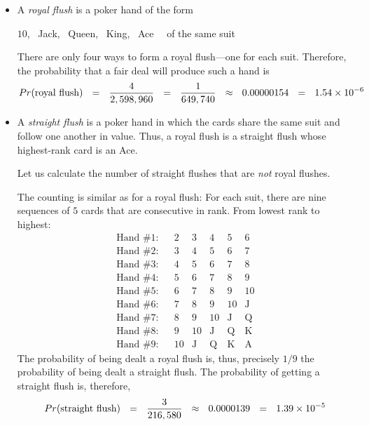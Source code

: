 \medskip

 
\begin{itemize}
\item
A {\it royal flush} is a poker hand of the form

\hspace*{.25in}$10$, \ {\sc Jack}, \ {\sc Queen}, \ {\sc King}, \ {\sc Ace} \ \ of the same suit

\noindent
There are only four ways to form a royal flush---one for each suit.  Therefore, the probability that
a fair deal will produce such a hand is
\[ 
Pr(\mbox{royal flush}) \ \ = \ \
\frac{4}{2,598,960} \ \ = \ \ {1 \over {649,740}} \ \ \approx \ \ 0.00000154 \ \ = \ \ 1.54 \times 10^{-6} \]

\item
A {\it straight flush} is a poker hand in which the cards share the same suit and follow one 
another in value.  Thus, a royal flush is a straight flush whose highest-rank card is an {\sc Ace}.

Let us calculate the number of straight flushes that are {\em not} royal flushes.

The counting is similar as for a royal flush:  For each suit, there are nine sequences of $5$ cards
that are consecutive in rank.  From lowest rank to highest:
\[ \begin{array}{llccccc}
\mbox{Hand \#1}: & &
2 & 3 & 4 & 5 & 6 \\
\mbox{Hand \#2}: & &
3 & 4 & 5 & 6 & 7 \\
\mbox{Hand \#3}: & &
4 & 5 & 6 & 7 & 8 \\
\mbox{Hand \#4}: & &
5 & 6 & 7 & 8 & 9 \\
\mbox{Hand \#5}: & &
6 & 7 & 8 & 9 & 10 \\
\mbox{Hand \#6}: & &
7 & 8 & 9 & 10 &  \mbox{J} \\
\mbox{Hand \#7}: & &
8 & 9 & 10 &  \mbox{J} &   \mbox{Q} \\
\mbox{Hand \#8}: & &
9 & 10 &  \mbox{J} & \mbox{Q} &  \mbox{K}  \\
\mbox{Hand \#9}: & &
10 &  \mbox{J}
     & \mbox{Q}
     & \mbox{K}
     & \mbox{A}
\end{array} \]
The probability of being dealt a royal flush is, thus, precisely $1/9$ the probability of being dealt a
straight flush.  The probability of getting a straight flush is, therefore,
\[  Pr(\mbox{straight flush}) \ \ = \ \
{3 \over {216,580}} \ \ \approx \ \ 0.0000139  \ \ = \ \ 1.39 \times 10^{-5} \]


\end{itemize}
